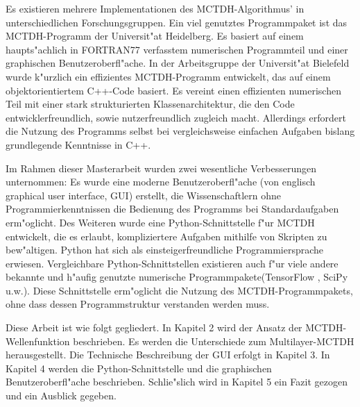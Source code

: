 Es existieren mehrere Implementationen des MCTDH-Algorithmus' in unterschiedlich\-en Forschungsgruppen.
Ein viel genutztes Programmpaket ist das MCTDH-Programm der Universit"at Heidelberg\cite{Heidelberg}. Es
basiert auf einem haupts"achlich in FORTRAN77 verfasstem numerischen Programmteil und einer
graphischen Benutzeroberfl"ache. In der Arbeitsgruppe der Universit"at Bielefeld wurde k"urzlich
ein effizientes MCTDH-Programm entwickelt, das auf einem objektorientiertem C++-Code basiert.
Es vereint einen effizienten numerischen Teil mit einer stark strukturierten Klassenarchitektur,
die den Code entwicklerfreundlich, sowie nutzerfreundlich zugleich macht. Allerdings erfordert
die Nutzung des Programms selbst bei vergleichsweise einfachen Aufgaben bislang
grundlegende Kenntnisse in C++.

Im Rahmen dieser Masterarbeit wurden zwei wesentliche Verbesserungen unternommen: 
Es wurde eine moderne Benutzeroberfl"ache (von englisch graphical user interface, GUI) erstellt,
die Wissenschaftlern ohne Programmierkenntnissen die Bedienung des Programms bei Standardaufgaben erm"oglicht.
Des Weiteren wurde eine Python-Schnittstelle f"ur MCTDH entwickelt,
die es erlaubt, kompliziertere Aufgaben mithilfe von Skripten zu bew"altigen.
Python hat sich als einsteigerfreundliche Programmiersprache erwiesen. 
Vergleichbare Python-Schnittstellen existieren auch f"ur viele andere bekannte und h"aufig genutzte 
numerische Programmpakete(TensorFlow \cite{TensorFlow}, SciPy \cite{SciPy} u.w.).
Diese Schnittstelle erm"oglicht die Nutzung des MCTDH-Programmpakets, ohne dass 
dessen Programmstruktur verstanden werden muss.
 
Diese Arbeit ist wie folgt gegliedert. In Kapitel 2 wird der Ansatz der MCTDH-Wellenfunk\-tion beschrieben. 
Es werden die Unterschiede zum Multilayer-MCTDH herausgestellt. Die Technische Beschreibung
der GUI erfolgt in Kapitel 3.
In Kapitel 4 werden die Python-Schnittstelle und die graphischen Benutzeroberfl"ache beschrieben.     
Schlie"slich wird in Kapitel 5 ein Fazit gezogen und ein Ausblick gegeben.     
